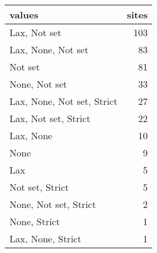 \begin{tabular}{lr}
\toprule
                    values &  sites \\
\midrule
              Lax, Not set &    103 \\
        Lax, None, Not set &     83 \\
                   Not set &     81 \\
             None, Not set &     33 \\
Lax, None, Not set, Strict &     27 \\
      Lax, Not set, Strict &     22 \\
                 Lax, None &     10 \\
                      None &      9 \\
                       Lax &      5 \\
           Not set, Strict &      5 \\
     None, Not set, Strict &      2 \\
              None, Strict &      1 \\
         Lax, None, Strict &      1 \\
\bottomrule
\end{tabular}
